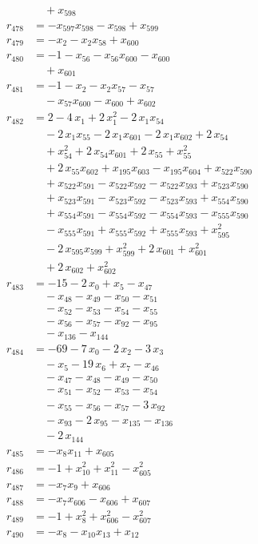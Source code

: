 \begin{align*}
&\quad{}+ x_{598} \\
r_{478} &= -x_{597} x_{598} - x_{598} + x_{599} \\
r_{479} &= -x_{2} - x_{2} x_{58} + x_{600} \\
r_{480} &= -1 - x_{56} - x_{56} x_{600} - x_{600} \\
&\quad{}+ x_{601} \\
r_{481} &= -1 - x_{2} - x_{2} x_{57} - x_{57} \\
&\quad{}- x_{57} x_{600} - x_{600} + x_{602} \\
r_{482} &= 2 - 4\,x_{1} + 2\,x_{1}^{2} - 2\,x_{1} x_{54} \\
&\quad{}- 2\,x_{1} x_{55} - 2\,x_{1} x_{601} - 2\,x_{1} x_{602} + 2\,x_{54} \\
&\quad{}+ x_{54}^{2} + 2\,x_{54} x_{601} + 2\,x_{55} + x_{55}^{2} \\
&\quad{}+ 2\,x_{55} x_{602} + x_{195} x_{603} - x_{195} x_{604} + x_{522} x_{590} \\
&\quad{}+ x_{522} x_{591} - x_{522} x_{592} - x_{522} x_{593} + x_{523} x_{590} \\
&\quad{}+ x_{523} x_{591} - x_{523} x_{592} - x_{523} x_{593} + x_{554} x_{590} \\
&\quad{}+ x_{554} x_{591} - x_{554} x_{592} - x_{554} x_{593} - x_{555} x_{590} \\
&\quad{}- x_{555} x_{591} + x_{555} x_{592} + x_{555} x_{593} + x_{595}^{2} \\
&\quad{}- 2\,x_{595} x_{599} + x_{599}^{2} + 2\,x_{601} + x_{601}^{2} \\
&\quad{}+ 2\,x_{602} + x_{602}^{2} \\
r_{483} &= -15 - 2\,x_{0} + x_{5} - x_{47} \\
&\quad{}- x_{48} - x_{49} - x_{50} - x_{51} \\
&\quad{}- x_{52} - x_{53} - x_{54} - x_{55} \\
&\quad{}- x_{56} - x_{57} - x_{92} - x_{95} \\
&\quad{}- x_{136} - x_{144} \\
r_{484} &= -69 - 7\,x_{0} - 2\,x_{2} - 3\,x_{3} \\
&\quad{}- x_{5} - 19\,x_{6} + x_{7} - x_{46} \\
&\quad{}- x_{47} - x_{48} - x_{49} - x_{50} \\
&\quad{}- x_{51} - x_{52} - x_{53} - x_{54} \\
&\quad{}- x_{55} - x_{56} - x_{57} - 3\,x_{92} \\
&\quad{}- x_{93} - 2\,x_{95} - x_{135} - x_{136} \\
&\quad{}- 2\,x_{144} \\
r_{485} &= -x_{8} x_{11} + x_{605} \\
r_{486} &= -1 + x_{10}^{2} + x_{11}^{2} - x_{605}^{2} \\
r_{487} &= -x_{7} x_{9} + x_{606} \\
r_{488} &= -x_{7} x_{606} - x_{606} + x_{607} \\
r_{489} &= -1 + x_{8}^{2} + x_{606}^{2} - x_{607}^{2} \\
r_{490} &= -x_{8} - x_{10} x_{13} + x_{12}
\end{align*}
